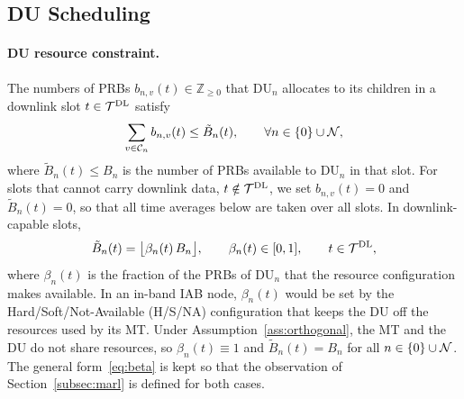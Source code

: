 \begin{EnChapter}
\section{DU Scheduling}
\label{subsec:coupling}

\paragraph{DU resource constraint.}
The numbers of PRBs $b_{n,v}(t) \in \mathbb{Z}_{\ge 0}$ that DU$_n$ allocates to its
children in a downlink slot $t \in \mathcal{T}^{\mathrm{DL}}$ satisfy
\begin{equation}
  \sum_{v \in \mathcal{C}_n} b_{n,v}(t) \le \tilde B_n(t), \qquad \forall n \in \{0\} \cup \mathcal{N},
  \label{eq:du-budget}
\end{equation}
where $\tilde B_n(t) \le B_n$ is the number of PRBs available to DU$_n$ in that
slot. For slots that cannot carry downlink data, $t \notin \mathcal{T}^{\mathrm{DL}}$, we
set $b_{n,v}(t) = 0$ and $\tilde B_n(t) = 0$, so that all time averages below are
taken over all slots. In downlink-capable slots,
\begin{equation}
  \tilde B_n(t) = \bigl\lfloor \beta_n(t)\, B_n \bigr\rfloor, \qquad
  \beta_n(t) \in [0,1], \qquad t \in \mathcal{T}^{\mathrm{DL}},
  \label{eq:beta}
\end{equation}
where $\beta_n(t)$ is the fraction of the PRBs of DU$_n$ that the resource
configuration makes available. In an in-band IAB node, $\beta_n(t)$ would be set by
the Hard/Soft/Not-Available (H/S/NA) configuration that keeps the DU off the
resources used by its MT. Under Assumption~\ref{ass:orthogonal}, the MT and the DU
do not share resources, so $\beta_n(t) \equiv 1$ and $\tilde B_n(t) = B_n$ for all
$n \in \{0\} \cup \mathcal{N}$. The general form~\eqref{eq:beta} is kept so that the
observation of Section~\ref{subsec:marl} is defined for both cases.


\end{EnChapter}

